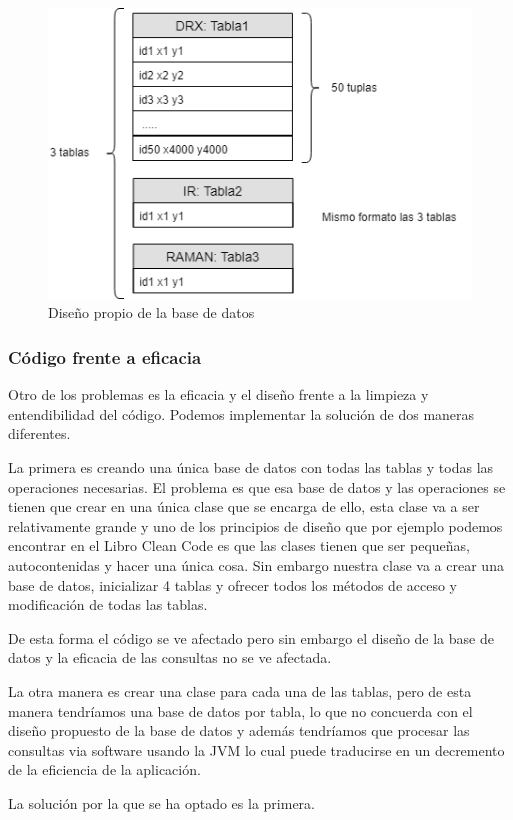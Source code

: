\begin{figure}[H]
    \centering
    \includegraphics[scale=0.75]{imagenes/disenoBaseDatos/sqliteDesign.png}
    \caption{Diseño propio de la base de datos}
    \label{fig:sqliteDesign}
\end{figure}


\subsubsection{Código frente a eficacia}

Otro de los problemas es la eficacia y el diseño frente a la limpieza y entendibilidad del código. Podemos implementar la solución de dos maneras diferentes. 

La primera es creando una única base de datos con todas las tablas y todas las operaciones necesarias. El problema es que esa base de datos y las operaciones se tienen que crear en una única clase que se encarga de ello, esta clase va a ser relativamente grande y uno de los principios de diseño que por ejemplo podemos encontrar en el Libro Clean Code \cite{cleanCode} es que las clases tienen que ser pequeñas, autocontenidas y hacer una única cosa. Sin embargo nuestra clase va a crear una base de datos, inicializar 4 tablas y ofrecer todos los métodos de acceso y modificación de todas las tablas.

De esta forma el código se ve afectado pero sin embargo el diseño de la base de datos y la eficacia de las consultas no se ve afectada.

La otra manera es crear una clase para cada una de las tablas, pero de esta manera tendríamos una base de datos por tabla, lo que no concuerda con el diseño propuesto de la base de datos y además tendríamos que procesar las consultas via software usando la JVM lo cual puede traducirse en un decremento de la eficiencia de la aplicación. 

La solución por la que se ha optado es la primera. 